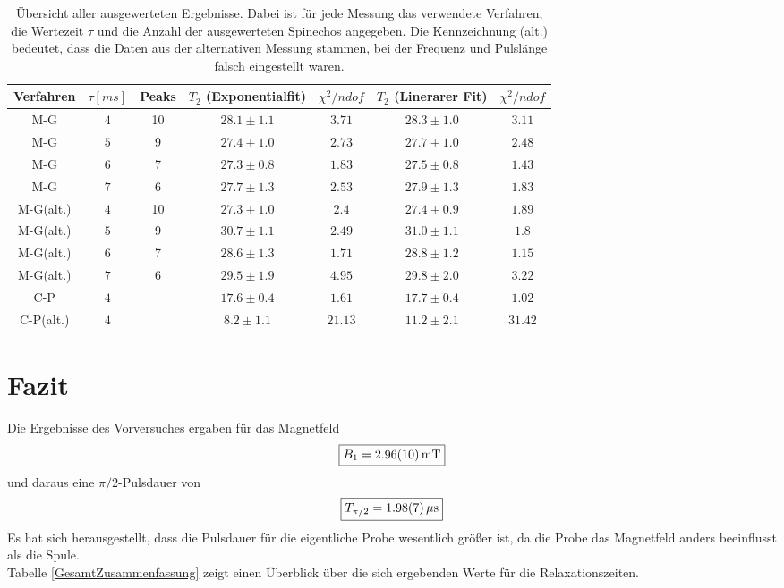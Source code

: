 \documentclass[12pt,a4paper]{article}
\begin{document}
\begin{table}
\begin{tabular}{|c|c|c||c|c||c|c|}
\hline
Verfahren & $\tau [ms]$ & Peaks &  $T_2$ (Exponentialfit) & $\chi^2/ndof$ &$T_2$ (Linerarer Fit) & $\chi^2/ndof$\\
\hline
M-G & $4$ & 10 & $ 28.1 \pm 1.1 $ & $ 3.71 $ & $ 28.3 \pm 1.0 $ & $ 3.11 $ \\
\hline
M-G & $5$ & 9 & $ 27.4 \pm 1.0 $ & $ 2.73 $ & $ 27.7 \pm 1.0 $ & $ 2.48 $ \\
\hline
M-G & $6$ & 7 & $ 27.3 \pm 0.8 $ & $ 1.83 $ & $ 27.5 \pm 0.8 $ & $ 1.43 $ \\
\hline
M-G & $7$ & 6 & $ 27.7 \pm 1.3 $ & $ 2.53 $ & $ 27.9 \pm 1.3 $ & $ 1.83 $ \\
\hline
\hline
M-G(alt.) & $4$ & 10 & $ 27.3 \pm 1.0 $ & $ 2.4 $ & $ 27.4 \pm 0.9 $ & $ 1.89 $ \\
\hline
M-G(alt.) & $5$ & 9 & $ 30.7 \pm 1.1 $ & $ 2.49 $ & $ 31.0 \pm 1.1 $ & $ 1.8 $ \\
\hline
M-G(alt.) & $6$ & 7 & $ 28.6 \pm 1.3 $ & $ 1.71 $ & $ 28.8 \pm 1.2 $ & $ 1.15 $ \\
\hline
M-G(alt.) & $7$ & 6 & $ 29.5 \pm 1.9 $ & $ 4.95 $ & $ 29.8 \pm 2.0 $ & $ 3.22 $ \\
\hline
\hline
C-P & $4$ &  & $17.6\pm 0.4$ & $1.61$ & $17.7\pm 0.4$ & $1.02$\\
\hline
C-P(alt.) & $4$ &  & $ 8.2 \pm 1.1 $ & $ 21.13 $ & $ 11.2 \pm 2.1 $ & $ 31.42 $ \\
\hline
\end{tabular}
\caption{Übersicht aller ausgewerteten Ergebnisse. Dabei ist für jede Messung das verwendete Verfahren, die Wertezeit $\tau$ und die Anzahl der ausgewerteten Spinechos angegeben. Die Kennzeichnung (alt.) bedeutet, dass die Daten aus der alternativen Messung stammen, bei der Frequenz und Pulslänge falsch eingestellt waren.}
\label{T2zusammenfassung}
\end{table}

\section{Fazit}

Die Ergebnisse des Vorversuches ergaben für das Magnetfeld 
\begin{equation*}
\boxed{B_1 = \SI{2.96\pm 0.10}{mT}}
\end{equation*}
und daraus eine $\pi /2$-Pulsdauer von
\begin{equation*}
\boxed{T_{\pi /2} = \SI{1.98\pm 0.07}{\mu s}}
\end{equation*}
Es hat sich herausgestellt, dass die Pulsdauer für die eigentliche Probe wesentlich größer ist, da die Probe das Magnetfeld anders beeinflusst als die Spule.\\
Tabelle \ref{GesamtZusammenfassung} zeigt einen Überblick über die sich ergebenden Werte für die Relaxationszeiten.
\end{document}
